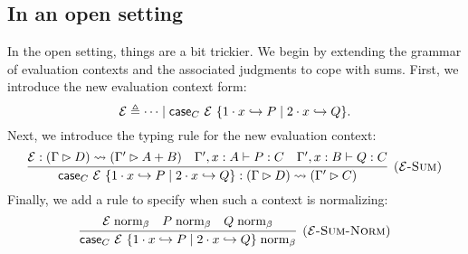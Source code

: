 \documentclass{article}
\begin{document}
\subsection{In an open setting}

In the open setting, things are a bit trickier.
We begin by extending the grammar of evaluation contexts and the associated judgments to cope with sums.
First, we introduce the new evaluation context form:
\[
  \mathcal{E} \triangleq \dotsb \mid \mathsf{case}_{C}\ \mathcal{E}\ \{1\cdot x \hookrightarrow P \mid 2\cdot x \hookrightarrow Q\}.
\]
Next, we introduce the typing rule for the new evaluation context:
\[
  \infer[\rn{$\E$-Sum}]{
    \hasC{\scase{C}{\E}{x}{P}{Q}}{\Gamma}{D}{\Gamma'}{C}
  }{
    \hasC{\E}{\Gamma}{D}{\Gamma'}{A + B}
    &
    \hasEF{\Gamma', x:A}{P}{C}
    &
    \hasEF{\Gamma', x:B}{Q}{C}
  }
\]
Finally, we add a rule to specify when such a context is normalizing:
\[
  \infer[\rn{$\E$-Sum-Norm}]{
    \bnorm{\scase{C}{\E}{x}{P}{Q}}
  }{
    \bnorm{\E}
    &
    \bnorm{P}
    &
    \bnorm{Q}
  }
\]



\end{document}
